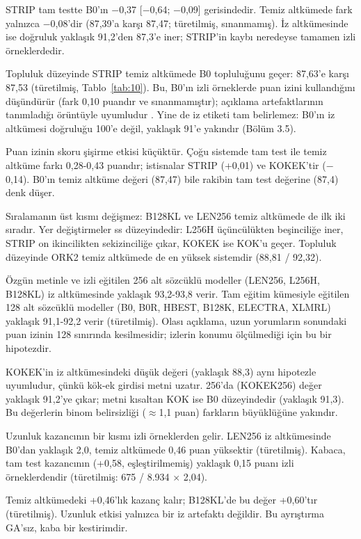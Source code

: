 \documentclass[11pt]{article}
\begin{document}
STRIP tam testte B0'ın $-$0,37 [$-$0,64; $-$0,09] gerisindedir. Temiz altkümede fark yalnızca $-$0,08'dir (87,39'a karşı 87,47; türetilmiş, sınanmamış). İz altkümesinde ise doğruluk yaklaşık 91,2'den 87,3'e iner; STRIP'in kaybı neredeyse tamamen izli örneklerdedir.

Topluluk düzeyinde STRIP temiz altkümede B0 topluluğunu geçer: 87,63'e karşı 87,53 (türetilmiş, Tablo~\ref{tab:10}). Bu, B0'ın izli örneklerde puan izini kullandığını düşündürür (fark 0,10 puandır ve sınanmamıştır); açıklama artefaktlarının tanımladığı örüntüyle uyumludur \citep{gururangan2018}. Yine de iz etiketi tam belirlemez: B0'ın iz altkümesi doğruluğu 100'e değil, yaklaşık 91'e yakındır (Bölüm 3.5).

Puan izinin skoru şişirme etkisi küçüktür. Çoğu sistemde tam test ile temiz altküme farkı 0,28-0,43 puandır; istisnalar STRIP (+0,01) ve KOKEK'tir ($-$0,14). B0'ın temiz altküme değeri (87,47) bile rakibin tam test değerine (87,4) denk düşer.

Sıralamanın üst kısmı değişmez: B128KL ve LEN256 temiz altkümede de ilk iki sıradır. Yer değiştirmeler ss düzeyindedir: L256H üçüncülükten beşinciliğe iner, STRIP on ikincilikten sekizinciliğe çıkar, KOKEK ise KOK'u geçer. Topluluk düzeyinde ORK2 temiz altkümede de en yüksek sistemdir (88,81 / 92,32).

Özgün metinle ve izli eğitilen 256 alt sözcüklü modeller (LEN256, L256H, B128KL) iz altkümesinde yaklaşık 93,2-93,8 verir. Tam eğitim kümesiyle eğitilen 128 alt sözcüklü modeller (B0, B0R, HBEST, B128K, ELECTRA, XLMRL) yaklaşık 91,1-92,2 verir (türetilmiş). Olası açıklama, uzun yorumların sonundaki puan izinin 128 sınırında kesilmesidir; izlerin konumu ölçülmediği için bu bir hipotezdir.

KOKEK'in iz altkümesindeki düşük değeri (yaklaşık 88,3) aynı hipotezle uyumludur, çünkü kök-ek girdisi metni uzatır. 256'da (KOKEK256) değer yaklaşık 91,2'ye çıkar; metni kısaltan KOK ise B0 düzeyindedir (yaklaşık 91,3). Bu değerlerin binom belirsizliği ($\approx$1,1 puan) farkların büyüklüğüne yakındır.

Uzunluk kazancının bir kısmı izli örneklerden gelir. LEN256 iz altkümesinde B0'dan yaklaşık 2,0, temiz altkümede 0,46 puan yüksektir (türetilmiş). Kabaca, tam test kazancının (+0,58, eşleştirilmemiş) yaklaşık 0,15 puanı izli örneklerdendir (türetilmiş: 675 / 8.934 $\times$ 2,04).

Temiz altkümedeki +0,46'lık kazanç kalır; B128KL'de bu değer +0,60'tır (türetilmiş). Uzunluk etkisi yalnızca bir iz artefaktı değildir. Bu ayrıştırma GA'sız, kaba bir kestirimdir.
\end{document}
